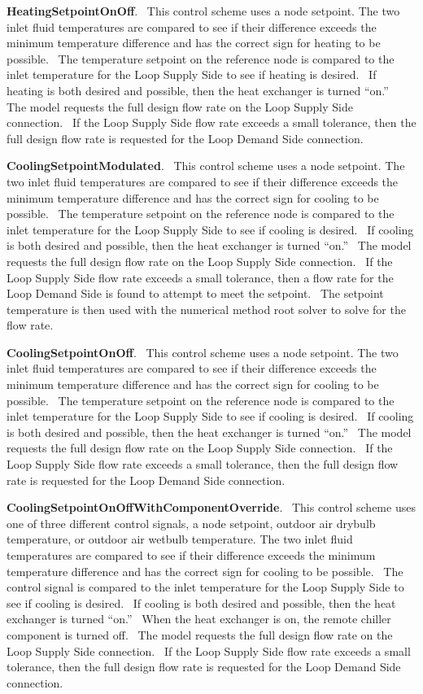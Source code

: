 \textbf{HeatingSetpointOnOff}.~ This control scheme uses a node setpoint. The two inlet fluid temperatures are compared to see if their difference exceeds the minimum temperature difference and has the correct sign for heating to be possible.~ The temperature setpoint on the reference node is compared to the inlet temperature for the Loop Supply Side to see if heating is desired.~ If heating is both desired and possible, then the heat exchanger is turned ``on.''~ The model requests the full design flow rate on the Loop Supply Side connection.~ If the Loop Supply Side flow rate exceeds a small tolerance, then the full design flow rate is requested for the Loop Demand Side connection.

\textbf{CoolingSetpointModulated}.~ This control scheme uses a node setpoint. The two inlet fluid temperatures are compared to see if their difference exceeds the minimum temperature difference and has the correct sign for cooling to be possible.~ The temperature setpoint on the reference node is compared to the inlet temperature for the Loop Supply Side to see if cooling is desired.~ If cooling is both desired and possible, then the heat exchanger is turned ``on.''~ The model requests the full design flow rate on the Loop Supply Side connection.~ If the Loop Supply Side flow rate exceeds a small tolerance, then a flow rate for the Loop Demand Side is found to attempt to meet the setpoint.~ The setpoint temperature is then used with the numerical method root solver to solve for the flow rate.

\textbf{CoolingSetpointOnOff}.~ This control scheme uses a node setpoint. The two inlet fluid temperatures are compared to see if their difference exceeds the minimum temperature difference and has the correct sign for cooling to be possible.~ The temperature setpoint on the reference node is compared to the inlet temperature for the Loop Supply Side to see if cooling is desired.~ If cooling is both desired and possible, then the heat exchanger is turned ``on.''~ The model requests the full design flow rate on the Loop Supply Side connection.~ If the Loop Supply Side flow rate exceeds a small tolerance, then the full design flow rate is requested for the Loop Demand Side connection.

\textbf{CoolingSetpointOnOffWithComponentOverride}.~ This control scheme uses one of three different control signals, a node setpoint, outdoor air drybulb temperature, or outdoor air wetbulb temperature. The two inlet fluid temperatures are compared to see if their difference exceeds the minimum temperature difference and has the correct sign for cooling to be possible.~ The control signal is compared to the inlet temperature for the Loop Supply Side to see if cooling is desired.~ If cooling is both desired and possible, then the heat exchanger is turned ``on.''~ When the heat exchanger is on, the remote chiller component is turned off.~ The model requests the full design flow rate on the Loop Supply Side connection.~ If the Loop Supply Side flow rate exceeds a small tolerance, then the full design flow rate is requested for the Loop Demand Side connection.

